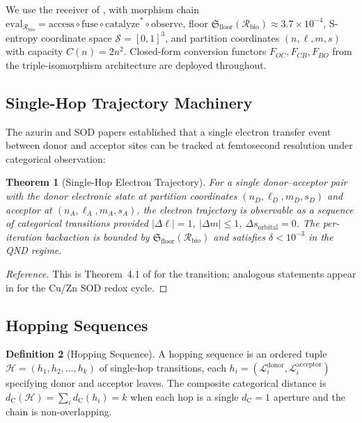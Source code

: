 \documentclass[11pt,twocolumn,a4paper]{article}
\newtheorem{theorem}{Theorem}[section]
\theoremstyle{definition}
\newtheorem{definition}[theorem]{Definition}
\theoremstyle{remark}
\newcommand{\Sspace}{\mathcal{S}}
\newcommand{\Recv}{\mathcal{R}}
\newcommand{\Floor}{\mathfrak{S}_{\mathrm{floor}}}
\renewcommand{\eval}{\mathrm{eval}}
\newcommand{\Leaf}{\mathcal{L}}
\newcommand{\dC}{d_{\mathrm{C}}}
\begin{document}
We use the receiver of \citep{sachikonye2025_paper1}, with morphism chain
$\eval_{\Recv_{\mathrm{bio}}} = \mathrm{access} \circ \mathrm{fuse} \circ \mathrm{catalyze}^* \circ \mathrm{observe}$,
floor $\Floor(\Recv_{\mathrm{bio}}) \approx 3.7 \times 10^{-4}$, S-entropy
coordinate space $\Sspace = [0,1]^3$, and partition coordinates
$(n, \ell, m, s)$ with capacity $C(n) = 2n^2$. Closed-form conversion
functors $F_{OC}, F_{CB}, F_{BO}$ from the triple-isomorphism architecture
\citep{sachikonye2025_isomorphism, sachikonye2025_paper3} are deployed throughout.

\subsection{Single-Hop Trajectory Machinery}

The azurin and SOD papers \citep{sachikonye2025_azurin, sachikonye2025_sod1}
established that a single electron transfer event between donor and acceptor
sites can be tracked at femtosecond resolution under categorical observation:

\begin{theorem}[Single-Hop Electron Trajectory]
\label{thm:single_hop}
For a single donor--acceptor pair with the donor electronic state at
partition coordinates $(n_D, \ell_D, m_D, s_D)$ and acceptor at $(n_A, \ell_A, m_A, s_A)$,
the electron trajectory is observable as a sequence of categorical
transitions provided $|\Delta\ell| = 1$, $|\Delta m| \leq 1$, $\Delta s_{\mathrm{orbital}} = 0$.
The per-iteration backaction is bounded by $\Floor(\Recv_{\mathrm{bio}})$ and
satisfies $\delta < 10^{-3}$ in the QND regime.
\end{theorem}

\begin{proof}[Reference]
This is Theorem~4.1 of \citep{sachikonye2025_azurin} for the
 transition; analogous statements appear in
\citep{sachikonye2025_sod1} for the Cu/Zn SOD redox cycle.
\end{proof}

\subsection{Hopping Sequences}

\begin{definition}[Hopping Sequence]
\label{def:hopping_seq}
A hopping sequence is an ordered tuple $\mathcal{H} = (h_1, h_2, \ldots, h_k)$
of single-hop transitions, each $h_i = (\Leaf_i^{\mathrm{donor}}, \Leaf_i^{\mathrm{acceptor}})$
specifying donor and acceptor leaves. The composite categorical distance is
$\dC(\mathcal{H}) = \sum_i \dC(h_i) = k$ when each hop is a single
$\dC = 1$ aperture and the chain is non-overlapping.
\end{definition}
\end{document}
